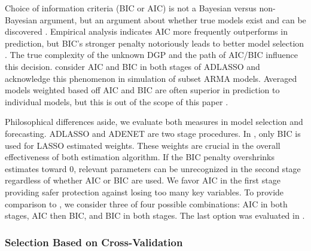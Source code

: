 Choice of information criteria (BIC or AIC) is not a Bayesian versus non-Bayesian argument, but an argument about whether true models exist and can be discovered \citep{burnham2003}. Empirical analysis indicates AIC more frequently outperforms in prediction, but BIC's stronger penalty notoriously leads to better model selection \citep{Burnham2004}. The true complexity of the unknown DGP and the path of AIC/BIC influence this decision\citep{Shao1997,burnham2003}. \cite{Chen2011} consider AIC and BIC in both stages of ADLASSO and acknowledge this phenomenon in simulation of subset ARMA models.  Averaged models weighted based off AIC and BIC are often superior in prediction to individual models, but this is out of the scope of this paper \citep{Burnham2004}. 

Philosophical differences aside, we evaluate both measures in model selection and forecasting. ADLASSO and ADENET are two stage procedures. In \cite{Chen2011}, only BIC is used for LASSO estimated weights. These weights are crucial in the overall effectiveness of both estimation algorithm. If the BIC penalty overshrinks estimates toward $0$, relevant parameters can be unrecognized in the second stage regardless of whether AIC or BIC are used. We favor AIC in the first stage providing safer protection against losing too many key variables. To provide comparison to \cite{Chen2011}, we consider three of four possible combinations: AIC in both stages, AIC then BIC, and BIC in both stages. The last option was evaluated in \cite{Chen2011}.

\subsubsection{Selection Based on Cross-Validation}

